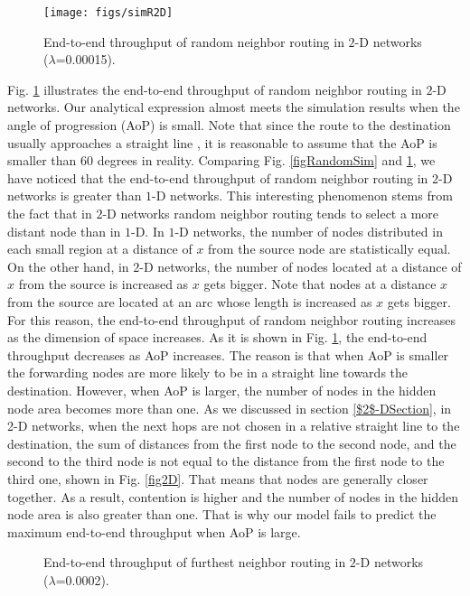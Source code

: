 \documentclass[12pt, draftclsnofoot, onecolumn]{IEEEtran}
\begin{document}
\begin{figure}
\centering
\texttt{[image: figs/simR2D]}
\caption{End-to-end throughput of random neighbor routing in $2$-D networks ($\lambda$=0.00015).}
\label{SimR2D}
\end{figure}


Fig. \ref{SimR2D} illustrates the end-to-end throughput of random 
neighbor routing in $2$-D networks. Our analytical expression almost 
meets the simulation results when the angle of progression (AoP) is 
small. Note that since the route to the destination usually approaches 
a straight line \cite{straightLine,baccelli2010stochastic}, it is reasonable to assume that the 
AoP is smaller than $60$ degrees in reality. Comparing Fig. \ref{figRandomSim} and \ref{SimR2D}, we have 
noticed that the end-to-end throughput of random neighbor routing 
in $2$-D networks is greater than $1$-D networks. This interesting 
phenomenon stems from the fact that in $2$-D networks random 
neighbor routing tends to select a more distant node than in $1$-D. 
In $1$-D networks, the number of nodes distributed in each small 
region at a distance of $x$ from the source node are statistically 
equal. On the other hand, in $2$-D networks, the number of nodes 
located at a distance of $x$ from the source is increased as $x$ 
gets bigger. Note that nodes at a distance $x$ from the source are 
located at an arc whose length is increased as $x$ gets bigger. For 
this reason, the end-to-end throughput of random neighbor routing 
increases as the dimension of space increases. 
As it is shown in Fig. \ref{SimR2D}, the end-to-end throughput decreases as AoP increases. The reason is that when AoP is smaller the forwarding nodes are more likely to be in a straight line towards the destination. However, when AoP is larger, the number of nodes in the hidden node area becomes more than one. As we discussed in section \ref{$2$-DSection}, in 2-D networks, when the next hops are not chosen in a relative straight line to the destination, the sum of distances 
from the first node to the second node, and the second to the third node is not equal to the distance from the first node to the third one, shown in Fig. \ref{fig2D}. That means that nodes are generally closer together. As a result, contention is higher and the number of nodes in the hidden node area is also greater than one. That is why our model fails to predict the maximum end-to-end throughput when AoP is large.

\begin{figure*}[t!]
\begin{center}
\caption{End-to-end throughput of furthest neighbor routing in $2$-D networks ($\lambda$=0.0002).}
\label{figFurthestSim2D}
\end{center}
\end{figure*}
 
\end{document}
